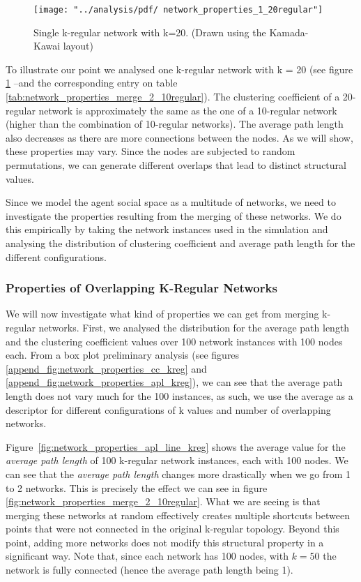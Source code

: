 \documentclass[preprint,number]{elsarticle}
\begin{document}
\begin{figure}
	\texttt{[image: "../analysis/pdf/ network\_properties\_1\_20regular"]}
	\begin{minipage}{0.8\linewidth}
		\caption{Single k-regular network with k=20. (Drawn using the Kamada-Kawai layout)}
		\label{fig:network_properties_1_20regular}
	\end{minipage}
\end{figure}

To illustrate our point we analysed one k-regular network with k = 20 (see figure \ref{fig:network_properties_1_20regular} --and the corresponding entry on table \ref{tab:network_properties_merge_2_10regular}). The clustering coefficient of a 20-regular network is approximately the same as the one of a 10-regular network (higher than the combination of 10-regular networks). The average path length also decreases as there are more connections between the nodes. As we will show, these properties may vary. Since the nodes are subjected to random permutations, we can generate different overlaps that lead to distinct structural values.

Since we model the agent social space as a multitude of networks, we need to investigate the properties resulting from the merging of these networks. We do this empirically by taking the network instances used in the simulation and analysing the distribution of clustering coefficient and average path length for the different configurations.

\subsubsection{Properties of Overlapping K-Regular Networks}
\label{sec:overlapping_kreg}
We will now investigate what kind of properties we can get from merging k-regular networks. First, we analysed the distribution for the average path length and the clustering coefficient values over 100 network instances with 100 nodes each. From a box plot preliminary analysis (see figures \ref{append_fig:network_properties_cc_kreg} and \ref{append_fig:network_properties_apl_kreg}), we can see that the average path length does not vary much for the 100 instances, as such, we use the average as a descriptor for different configurations of k values and number of overlapping networks. 

Figure~\ref{fig:network_properties_apl_line_kreg} shows the average value for the \textit{average path length} of 100 k-regular network instances, each with 100 nodes. We can see that the \textit{average path length} changes more drastically when we go from 1 to 2 networks. This is precisely the effect we can see in figure \ref{fig:network_properties_merge_2_10regular}. What we are seeing is that merging these networks at random effectively creates multiple shortcuts between points that were not connected in the original k-regular topology. Beyond this point, adding more networks does not modify this structural property in a significant way. Note that, since each network has 100 nodes, with $k=50$ the network is fully connected (hence the average path length being 1). 
\end{document}
